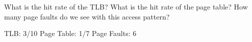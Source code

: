 \begin{blocksection}
\question 
What is the hit rate of the TLB? What is the hit rate of the page table? How many page faults do we see with this access pattern?

\begin{solution}[0.5in]
TLB: 3/10
Page Table: 1/7
Page Faults: 6
\end{solution}

\end{blocksection}